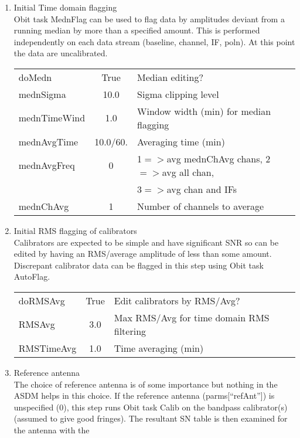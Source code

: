\documentclass[11pt]{article}
\begin{document}
\begin{enumerate}
\begin{center}
\begin{tabular}{|l|c|l|}
\hline
\end{tabular}
\end{center}
%
\item Initial Time domain flagging\\
Obit task MednFlag can be used to flag data by amplitudes deviant from
a running median by more than a specified amount.
This is performed independently on each data stream (baseline,
channel, IF, poln).
At this point the data are uncalibrated.
\begin{center}
\begin{tabular}{|l|c|l|}
\hline
doMedn       & True & Median editing? \\
mednSigma    & 10.0 &  Sigma clipping level\\
mednTimeWind & 1.0  &  Window width (min) for median flagging\\
mednAvgTime  & 10.0/60. & Averaging time (min) \\
mednAvgFreq  & 0    &  1$=>$avg mednChAvg chans, 2$=>$avg all chan,\\
 & & 3$=>$avg chan and IFs\\
mednChAvg    & 1    &  Number of channels to average\\
\hline
\end{tabular}
\end{center}
%
\item Initial RMS flagging of calibrators \\
Calibrators are expected to be simple and have  significant SNR so can
be edited by having an RMS/average amplitude of less than some
amount.
Discrepant calibrator data can be flagged in this step using Obit task
AutoFlag.
\begin{center}
\begin{tabular}{|l|c|l|}
\hline
doRMSAvg   & True &  Edit calibrators by RMS/Avg?\\
RMSAvg     & 3.0  &  Max RMS/Avg for time domain RMS filtering\\
RMSTimeAvg & 1.0  &  Time averaging (min)\\
\hline
\end{tabular}
\end{center}
%
\item Reference antenna\\
The choice of reference antenna is of some importance but nothing in
the ASDM helps in this choice.
If the reference antenna (parms[``refAnt'']) is unspecified (0),
this step runs Obit task Calib on the bandpass calibrator(s) (assumed to
give good fringes).
The resultant SN table is then examined for the antenna with the

\end{enumerate}
\end{document}
